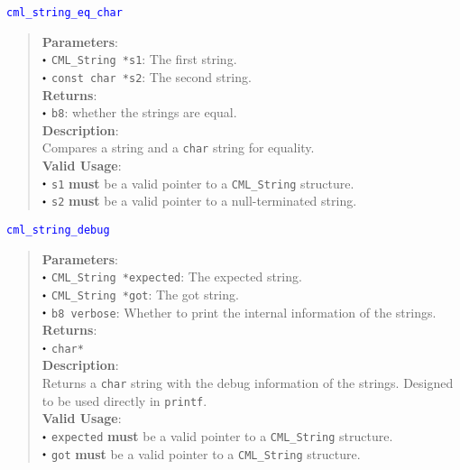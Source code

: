 \documentclass[a4paper,oneside,10pt]{article}
\newcommand{\function}[1]{
  \noindent\textcolor{blue}{\texttt{#1}}
  \vspace{-0.3em}
}
\renewcommand{\dot}{\raisebox{0.3ex}{\scalebox{0.6}{$\bullet$}}}
\theoremstyle{definition}
\begin{document}
\function{cml\_string\_eq\_char}
\begin{quote}
  \textbf{Parameters}: \\
  $\dot$ \texttt{CML\_String *s1}: The first string. \\
  $\dot$ \texttt{const char *s2}: The second string. \\
  \textbf{Returns}: \\
  $\dot$ \texttt{b8}: whether the strings are equal. \\

  \vspace{-0.75em}
  \textbf{Description}: \\
  Compares a string and a \texttt{char} string for equality. \\

  \vspace{-0.75em}
  \textbf{Valid Usage}: \\
  $\dot$ \texttt{s1} \textbf{must} be a valid pointer to a \texttt{CML\_String} structure. \\
  $\dot$ \texttt{s2} \textbf{must} be a valid pointer to a null-terminated string. \\
\end{quote}

\function{cml\_string\_debug}
\begin{quote}
  \textbf{Parameters}: \\
  $\dot$ \texttt{CML\_String *expected}: The expected string. \\
  $\dot$ \texttt{CML\_String *got}: The got string. \\
  $\dot$ \texttt{b8 verbose}: Whether to print the internal information of the strings. \\
  \textbf{Returns}: \\
  $\dot$ \texttt{char*} \\

  \vspace{-0.75em}
  \textbf{Description}: \\
  Returns a \texttt{char} string with the debug information of the strings. Designed to be used directly in \texttt{printf}. \\
  
  \vspace{-0.75em}
  \textbf{Valid Usage}: \\
  $\dot$ \texttt{expected} \textbf{must} be a valid pointer to a \texttt{CML\_String} structure. \\
  $\dot$ \texttt{got} \textbf{must} be a valid pointer to a \texttt{CML\_String} structure. \\
\end{quote}
\end{document}

